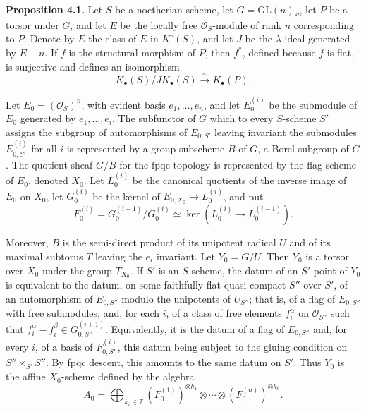 \textbf{Proposition 4.1.} Let $S$ be a noetherian scheme, let $G=\mathrm{GL}(n)_S$, let $P$ be a torsor under $G$, and let $E$ be the locally free $\mathcal O_S$-module of rank $n$ corresponding to $P$. Denote by $E$ the class of $E$ in $K^\circ(S)$, and let $J$ be the $\lambda$-ideal generated by $E-n$. If $f$ is the structural morphism of $P$, then $f^*$, defined because $f$ is flat, is surjective and defines an isomorphism
\[
 K_\bullet(S)/J K_\bullet(S)\xrightarrow{\sim}K_\bullet(P).
\]

Let $E_0=(\mathcal O_S)^n$, with evident basis $e_1,\ldots,e_n$, and let $E_0^{(i)}$ be the submodule of $E_0$ generated by $e_1,\ldots,e_i$. The subfunctor of $G$ which to every $S$-scheme $S'$ assigns the subgroup of automorphisms of $E_{0,S'}$ leaving invariant the submodules $E_{0,S'}^{(i)}$ for all $i$ is represented by a group subscheme $B$ of $G$, a Borel subgroup of $G$. The quotient sheaf $G/B$ for the fpqc topology is represented by the flag scheme of $E_0$, denoted $X_0$. Let $L_0^{(i)}$ be the canonical quotients of the inverse image of $E_0$ on $X_0$, let $G_0^{(i)}$ be the kernel of $E_{0,X_0}\to L_0^{(i)}$, and put
\[
 F_0^{(i)}=G_0^{(i-1)}/G_0^{(i)}\simeq \ker(L_0^{(i)}\to L_0^{(i-1)}).
\]

Moreover, $B$ is the semi-direct product of its unipotent radical $U$ and of its maximal subtorus $T$ leaving the $e_i$ invariant. Let $Y_0=G/U$. Then $Y_0$ is a torsor over $X_0$ under the group $T_{X_0}$. If $S'$ is an $S$-scheme, the datum of an $S'$-point of $Y_0$ is equivalent to the datum, on some faithfully flat quasi-compact $S''$ over $S'$, of an automorphism of $E_{0,S''}$ modulo the unipotents of $U_{S''}$; that is, of a flag of $E_{0,S''}$ with free submodules, and, for each $i$, of a class of free elements $f_i^\alpha$ on $\mathcal O_{S''}$ such that $f_i^\alpha-f_i^\beta\in G_{0,S''}^{(i+1)}$. Equivalently, it is the datum of a flag of $E_{0,S''}$ and, for every $i$, of a basis of $F_{0,S''}^{(i)}$, this datum being subject to the gluing condition on $S''\times_{S'}S''$. By fpqc descent, this amounts to the same datum on $S'$. Thus $Y_0$ is the affine $X_0$-scheme defined by the algebra
\[
 A_0=\bigoplus_{k_i\in\mathbb Z}(F_0^{(1)})^{\otimes k_1}\otimes\cdots\otimes(F_0^{(n)})^{\otimes k_n}.
\]

